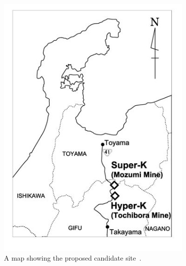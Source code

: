\begin{figure}[h!]
\begin{minipage}[b]{0.39\textwidth}
    \includegraphics[width=\textwidth]{figures/hyperk2.jpeg}
       \vspace{2mm}
    \caption{A map showing the proposed candidate site~\cite{24HyperK}.}
     \label{fig:hyper2}
  \end{minipage}
\end{figure}

\pagebreak
\FloatBarrier
